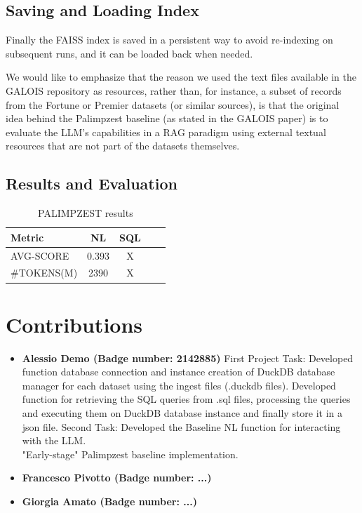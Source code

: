 \documentclass[12pt,a4paper]{article}
\begin{document}
\subsection{Saving and Loading Index}
Finally the FAISS index is saved in a persistent way to avoid re-indexing on subsequent runs, and it can be loaded back when needed.

We would like to emphasize that the reason we used the text files available in the GALOIS repository as resources, rather than, for instance, a subset of records from the Fortune or Premier datasets (or similar sources), is that the original idea behind the Palimpzest baseline (as stated in the GALOIS paper) is to evaluate the LLM’s capabilities in a RAG paradigm using external textual resources that are not part of the datasets themselves.

\subsection{Results and Evaluation}

\begin{table}[h]
\centering
\begin{tabular}{lcccc}
\toprule
\textbf{Metric} & \textbf{NL} & \textbf{SQL}  \\
\midrule

AVG-SCORE & 0.393 & X  \\
\#TOKENS(M) & 2390 & X  \\

\bottomrule
\end{tabular}
\caption{PALIMPZEST results}
\label{palimpzest_results}
\end{table}


\section{Contributions}
\begin{itemize}
    \item \textbf{Alessio Demo (Badge number: 2142885)} First Project Task:  Developed function database connection and instance creation of DuckDB database manager for each dataset using the ingest files (.duckdb files).
    Developed function for retrieving the SQL queries from .sql files, processing the queries and executing them on DuckDB database instance and finally store it in a json file.
    Second Task: Developed the Baseline NL function for interacting with the LLM.
    \\"Early-stage" Palimpzest baseline implementation.
    \item \textbf{Francesco Pivotto (Badge number: ...)}
    \item \textbf{Giorgia Amato (Badge number: ...)}
\end{itemize}
\end{document}

